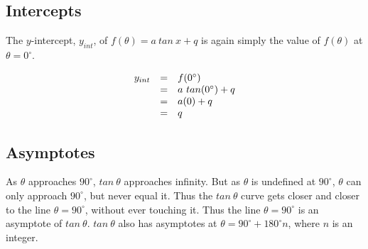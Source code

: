 \subsection*{Intercepts}
\nopagebreak
The $y$-intercept, ${y}_{int}$, of $f(\theta )=a~tan~x+q$ is again simply the value of $f(\theta )$ at $\theta ={0}^{\circ }$.\par 
\nopagebreak\noindent{}
\begin{equation*}
\begin{array}{ccc}\hfill {y}_{int}& =& f({0}^{\circ })\hfill \\
 & =& a~tan({0}^{\circ })+q\hfill \\
 & =& a(0)+q\hfill \\
 & =& q\hfill 
\end{array}
\end{equation*}

\subsection*{Asymptotes}
\nopagebreak
As $\theta $ approaches ${90}^{\circ }$, $tan~\theta $ approaches infinity. But as $\theta $ is undefined at ${90}^{\circ }$, $\theta $ can only approach ${90}^{\circ }$, but never equal it. Thus the $tan~\theta $ curve gets closer and closer to the line $\theta ={90}^{\circ }$, without ever touching it. Thus the line $\theta ={90}^{\circ }$ is an asymptote of $tan~\theta $. $tan~\theta $ also has asymptotes at $\theta ={90}^{\circ }+{180}^{\circ }n$, where $n$ is an integer.\par 

